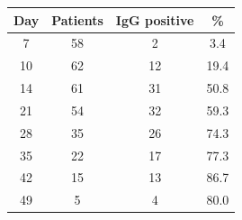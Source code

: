  \begin{tabular}{|c | c | c | c |} 
 \hline
 Day & Patients & IgG positive & \% \\ [0.5ex] 
 \hline\hline
 7 & 58 & 2 & 3.4 \\ 
 \hline
 10 & 62 & 12 & 19.4 \\
 \hline
 14 & 61 & 31 & 50.8 \\
 \hline
 21 & 54 & 32 & 59.3 \\
 \hline
 28 & 35 & 26 & 74.3 \\ 
 \hline
 35 & 22 & 17 & 77.3 \\
 \hline
 42 & 15 & 13 & 86.7 \\
 \hline
 49 & 5 & 4 & 80.0  \\ [1ex] 
 \hline
\end{tabular}